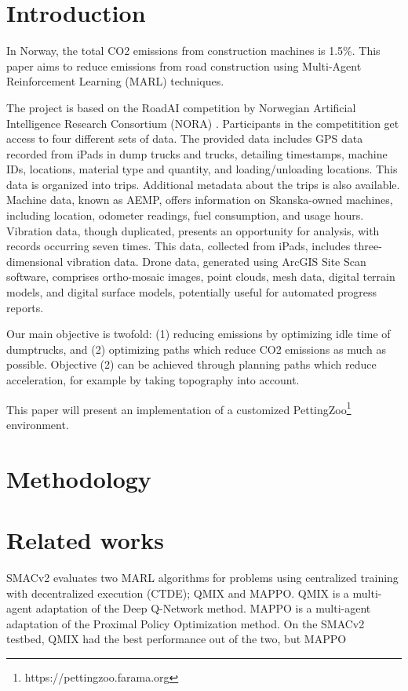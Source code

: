 \documentclass[conference]{IEEEtran}
\begin{document}
\section{Introduction}
In Norway, the total CO2 emissions from construction machines is 1.5\%. \cite{noraRoadAIReducing}
This paper aims to reduce emissions from road construction using Multi-Agent Reinforcement Learning
(MARL) techniques.

The project is based on the RoadAI competition by Norwegian Artificial Intelligence Research
Consortium (NORA) \cite{noraRoadAIReducing}. Participants in the competitition get access to four
different sets of data. The provided data includes GPS data recorded from iPads in dump trucks and
trucks, detailing timestamps, machine IDs, locations, material type and quantity, and loading/unloading
locations. This data is organized into trips. Additional metadata about the trips is also available.
Machine data, known as AEMP, offers information on Skanska-owned machines, including location,
odometer readings, fuel consumption, and usage hours. Vibration data, though duplicated,
presents an opportunity for analysis, with records occurring seven times. This data, collected from
iPads, includes three-dimensional vibration data. Drone data, generated using ArcGIS Site Scan software,
comprises ortho-mosaic images, point clouds, mesh data, digital terrain models, and digital surface models,
potentially useful for automated progress reports.

Our main objective is twofold: (1) reducing emissions by optimizing idle time of dumptrucks, and (2)
optimizing paths which reduce CO2 emissions as much as possible. Objective (2) can be achieved through
planning paths which reduce acceleration, for example by taking topography into account.

This paper will present an implementation of a customized PettingZoo\footnote{https://pettingzoo.farama.org}
environment.


\section{Methodology}


\section{Related works}
SMACv2 \cite{ellis2022smacv2} evaluates two MARL algorithms for problems using centralized training with
decentralized execution (CTDE); QMIX and MAPPO. QMIX is a multi-agent adaptation of the Deep Q-Network method.
MAPPO is a multi-agent adaptation of the Proximal Policy Optimization method. On the SMACv2 testbed, QMIX
had the best performance out of the two, but MAPPO 


{}

\end{document}
